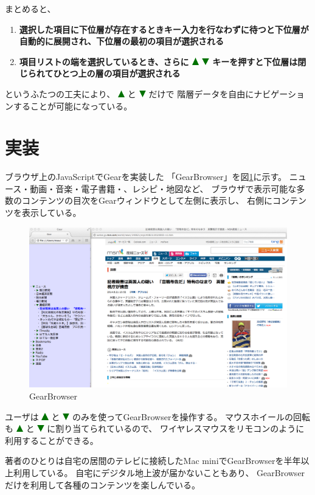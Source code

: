 \documentclass[twoside]{wiss}
\def\GEAR{\textsf{Gear}}
\def\GB{\textsf{GearBrowser}}
\def\up{ \includegraphics[width=3mm,bb=0 0 36 36]{figures/uptriangle.pdf} }
\def\down{ \includegraphics[width=3mm,bb=0 0 36 36]{figures/downtriangle.pdf} }
\begin{document}
まとめると、

\begin{enumerate}
\item \textbf{選択した項目に下位層が存在するときキー入力を行なわずに待つと下位層が自動的に展開され、下位層の最初の項目が選択される}
\item \textbf{項目リストの端を選択しているとき、さらに{\up}{\down}キーを押すと下位層は閉じられてひとつ上の層の項目が選択される}
\end{enumerate}

\noindent
というふたつの工夫により、
{\up}と{\down}だけで
階層データを自由にナビゲーションすることが可能になっている。

\section{実装}

ブラウザ上のJavaScriptで{\GEAR}を実装した
「{\GB}」を図\ref{gearbrowser}に示す。
ニュース・動画・音楽・電子書籍・、レシピ・地図など、
ブラウザで表示可能な多数のコンテンツの目次を{\GEAR}ウィンドウとして左側に表示し、
右側にコンテンツを表示している。

\begin{figure}
\centerline{\includegraphics[width=180mm,bb=0 0 1401 872]{figures/ab4ff7c2d44f4af2bb94fae76589f495.png}}
\caption{\textsf{GearBrowser}}
\label{gearbrowser}
\end{figure}

ユーザは{\up}と{\down}のみを使って{\GB}を操作する。
マウスホイールの回転も{\up}と{\down}に割り当てられているので、
ワイヤレスマウスをリモコンのように利用することができる。

著者のひとりは自宅の居間のテレビに接続したMac miniで{\GB}を半年以上利用している。
自宅にデジタル地上波が届かないこともあり、
{\GB}だけを利用して各種のコンテンツを楽しんでいる。
\end{document}
